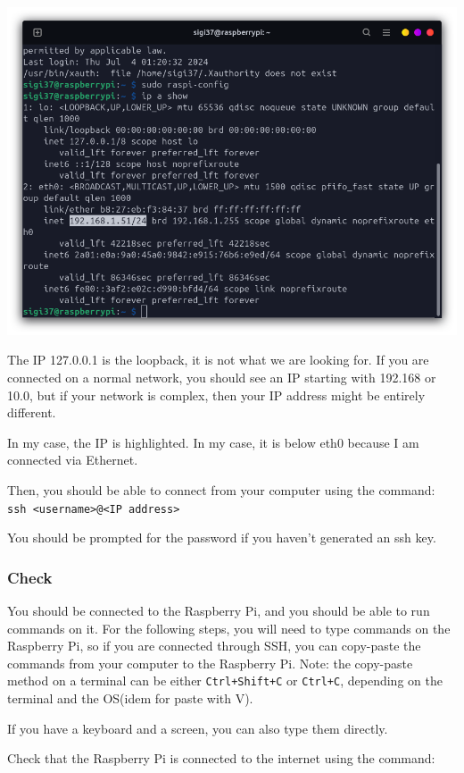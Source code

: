 \documentclass{article}
\begin{document}
\includegraphics[scale=0.37]{img/ip_a_show.png}

The IP 127.0.0.1 is the loopback, it is not what we are looking for.
If you are connected on a normal network, you should see an IP
starting with 192.168 or 10.0, but if your network is complex, then your IP address might
be entirely different.

In my case, the IP is highlighted. In my case, it is below eth0 because I am connected via
Ethernet.

Then, you should be able to connect from your computer using the command:
\texttt{ssh <username>@<IP address>}

You should be prompted for the password if you haven't generated an ssh key.

\subsubsection{Check}

You should be connected to the Raspberry Pi, and you should be able to run commands on it.
For the following steps, you will need to type commands on the Raspberry Pi, so if you are
connected through SSH, you can copy-paste the commands from your computer to the Raspberry Pi.
Note: the copy-paste method on a terminal can be either \texttt{Ctrl+Shift+C} or
\texttt{Ctrl+C}, depending on the terminal and the OS(idem for paste with V).

If you have a keyboard and a screen, you can also type them directly.

Check that the Raspberry Pi is connected to the internet using the command:
\end{document}
